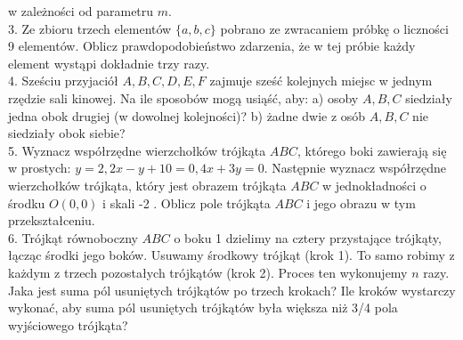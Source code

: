 \documentclass[10pt]{article}
\begin{document}
w zależności od parametru $m$.\\
3. Ze zbioru trzech elementów $\{a, b, c\}$ pobrano ze zwracaniem próbkę o liczności 9 elementów. Oblicz prawdopodobieństwo zdarzenia, że w tej próbie każdy element wystąpi dokładnie trzy razy.\\
4. Sześciu przyjaciół $A, B, C, D, E, F$ zajmuje sześć kolejnych miejsc w jednym rzędzie sali kinowej. Na ile sposobów mogą usiąść, aby: a) osoby $A, B, C$ siedziały jedna obok drugiej (w dowolnej kolejności)? b) żadne dwie z osób $A, B, C$ nie siedziały obok siebie?\\
5. Wyznacz współrzędne wierzchołków trójkąta $A B C$, którego boki zawierają się w prostych: $y=2,2 x-y+10=0,4 x+3 y=0$. Następnie wyznacz współrzędne wierzchołków trójkąta, który jest obrazem trójkąta $A B C$ w jednokładności o środku $O(0,0)$ i skali -2 . Oblicz pole trójkąta $A B C$ i jego obrazu w tym przekształceniu.\\
6. Trójkąt równoboczny $A B C$ o boku 1 dzielimy na cztery przystające trójkąty, łącząc środki jego boków. Usuwamy środkowy trójkąt (krok 1). To samo robimy z każdym z trzech pozostałych trójkątów (krok 2). Proces ten wykonujemy $n$ razy. Jaka jest suma pól usuniętych trójkątów po trzech krokach? Ile kroków wystarczy wykonać, aby suma pól usuniętych trójkątów była większa niż 3/4 pola wyjściowego trójkąta?
\end{document}
